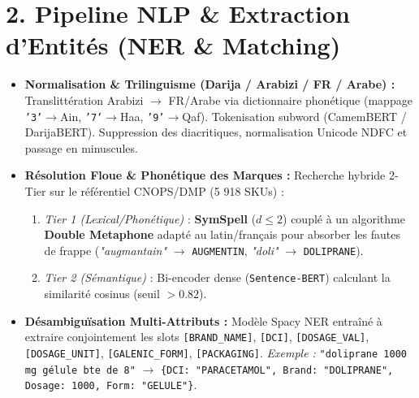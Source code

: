 \documentclass[10pt,a4paper]{article}
\begin{document}
\section*{2. Pipeline NLP \& Extraction d'Entités (NER \& Matching)}
\begin{itemize}
    \item \textbf{Normalisation \& Trilinguisme (Darija / Arabizi / FR / Arabe) :}
    Translittération Arabizi $\rightarrow$ FR/Arabe via dictionnaire phonétique (mappage \texttt{'3'}$\rightarrow$Ain, \texttt{'7'}$\rightarrow$Haa, \texttt{'9'}$\rightarrow$Qaf). Tokenisation subword (CamemBERT / DarijaBERT). Suppression des diacritiques, normalisation Unicode NDFC et passage en minuscules.
    \item \textbf{Résolution Floue \& Phonétique des Marques :}
    Recherche hybride 2-Tier sur le référentiel CNOPS/DMP (5 918 SKUs) :
    \begin{enumerate}[label=\alph*),itemsep=1pt,topsep=1pt]
        \item \textit{Tier 1 (Lexical/Phonétique)} : \textbf{SymSpell} ($d \le 2$) couplé à un algorithme \textbf{Double Metaphone} adapté au latin/français pour absorber les fautes de frappe (\textit{"augmantain"} $\rightarrow$ \texttt{AUGMENTIN}, \textit{"doli"} $\rightarrow$ \texttt{DOLIPRANE}).
        \item \textit{Tier 2 (Sémantique)} : Bi-encoder dense (\texttt{Sentence-BERT}) calculant la similarité cosinus (seuil $> 0.82$).
    \end{enumerate}
    \item \textbf{Désambiguïsation Multi-Attributs :} Modèle Spacy NER entraîné à extraire conjointement les slots \texttt{[BRAND\_NAME]}, \texttt{[DCI]}, \texttt{[DOSAGE\_VAL]}, \texttt{[DOSAGE\_UNIT]}, \texttt{[GALENIC\_FORM]}, \texttt{[PACKAGING]}.\newline
    \textit{Exemple :} \texttt{"doliprane 1000 mg gélule bte de 8"} $\rightarrow$ \texttt{\{DCI: "PARACETAMOL", Brand: "DOLIPRANE", Dosage: 1000, Form: "GELULE"\}}.
\end{itemize}

\end{document}
